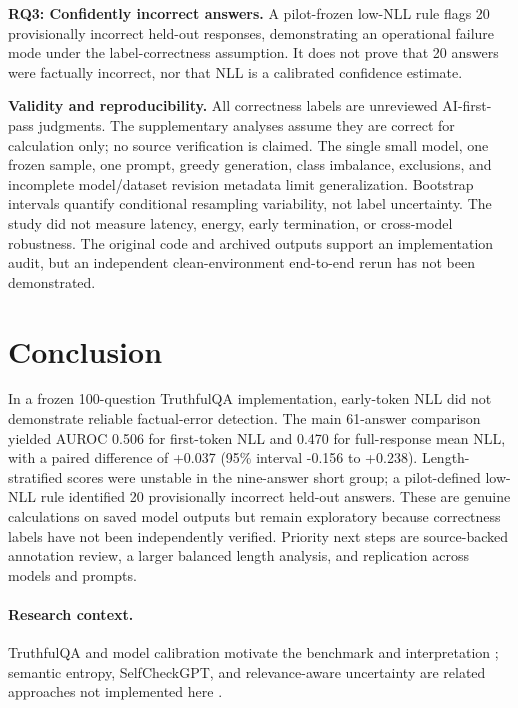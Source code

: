 \documentclass[runningheads]{llncs}
\begin{document}
\textbf{RQ3: Confidently incorrect answers.} A pilot-frozen low-NLL rule flags 20 provisionally incorrect held-out responses, demonstrating an operational failure mode under the label-correctness assumption. It does not prove that 20 answers were factually incorrect, nor that NLL is a calibrated confidence estimate.

\textbf{Validity and reproducibility.} All correctness labels are unreviewed AI-first-pass judgments. The supplementary analyses assume they are correct for calculation only; no source verification is claimed. The single small model, one frozen sample, one prompt, greedy generation, class imbalance, exclusions, and incomplete model/dataset revision metadata limit generalization. Bootstrap intervals quantify conditional resampling variability, not label uncertainty. The study did not measure latency, energy, early termination, or cross-model robustness. The original code and archived outputs support an implementation audit, but an independent clean-environment end-to-end rerun has not been demonstrated.
\section{Conclusion}
In a frozen 100-question TruthfulQA implementation, early-token NLL did not demonstrate reliable factual-error detection. The main 61-answer comparison yielded AUROC 0.506 for first-token NLL and 0.470 for full-response mean NLL, with a paired difference of +0.037 (95\% interval -0.156 to +0.238). Length-stratified scores were unstable in the nine-answer short group; a pilot-defined low-NLL rule identified 20 provisionally incorrect held-out answers. These are genuine calculations on saved model outputs but remain exploratory because correctness labels have not been independently verified. Priority next steps are source-backed annotation review, a larger balanced length analysis, and replication across models and prompts.
\paragraph{Research context.} TruthfulQA and model calibration motivate the benchmark and interpretation \cite{lin2022,guo2017}; semantic entropy, SelfCheckGPT, and relevance-aware uncertainty are related approaches not implemented here \cite{farquhar2024,manakul2023,duan2024}.
\end{document}

